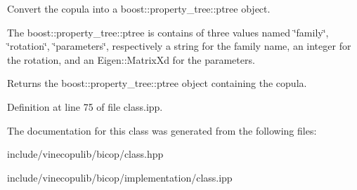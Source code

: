 Convert the copula into a boost\+::property\+\_\+tree\+::ptree object. 

The boost\+::property\+\_\+tree\+::ptree is contains of three values named {\ttfamily \char`\"{}family\char`\"{}}, {\ttfamily \char`\"{}rotation\char`\"{}}, {\ttfamily \char`\"{}parameters\char`\"{}}, respectively a string for the family name, an integer for the rotation, and an Eigen\+::\+Matrix\+Xd for the parameters.

\begin{DoxyReturn}{Returns}
the boost\+::property\+\_\+tree\+::ptree object containing the copula. 
\end{DoxyReturn}


Definition at line 75 of file class.\+ipp.



The documentation for this class was generated from the following files\+:\begin{DoxyCompactItemize}
\item 
include/vinecopulib/bicop/class.\+hpp\item 
include/vinecopulib/bicop/implementation/class.\+ipp\end{DoxyCompactItemize}
